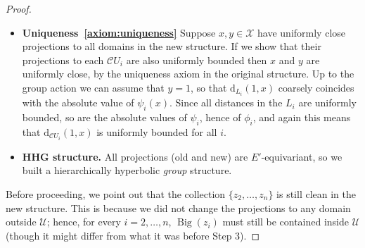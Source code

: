 \documentclass[svgnames]{amsart}
\theoremstyle{plain}
\theoremstyle{definition}
\newcommand{\cal}[1]{\mathcal{#1}}
\newcommand{\C}{\cal C}
\newcommand{\Bigdom}[1]{\operatorname{Big}\left(#1\right)}
\newcommand{\dist}{\mathrm{d}}
\begin{document}
\begin{proof}
\begin{itemize}
        
        Thus, suppose $\Bigdom{z}$ intersects the support of $\cal V$ nontrivially. If $U_1$ appears in $\cal V$ then let $g_1$ be the coordinate $q_1\in L_1$ that we have to realise; otherwise let $g_1=1\in E'$. Whenever $U_i\in \cal V$ for some $i\ge 2$ let $q_i\in L_i$ the coordinate to realise, choose $g_i\in E'$ such that $\phi_i(g_i)=\psi_i(q_i)+\psi_1(g_1)$, and let $p_i=\pi_{\C U_i}(g_i)$.
        By the partial realisation axiom for the original structure, there exists some $x\in \cal X$ realising the collection $$\{(U_i, p_i\in \cal C U_i)\}_{U_i\in (\Bigdom{z}-\{U_1\})\cap \cal V}\cup \{(V_i,q_i\in \C V_i)\}_{V_i\in \cal V-(\Bigdom{z}-\{U_1\})},$$
        and we claim that $x$ is uniformly close to $p_i$ in each $L_i$. Since $x$ is a realisation point, for every $i=1,\ldots,j$ we have that $\dist_{\C U_i}(g_i,x)\le \delta$, so that $\phi_i(x)$ and $\phi_i(g_i)$ are uniformly close. In turn, this means that $\psi_i(x)$ is uniformly close to $\psi_i(p_i)$ for all $i$, and therefore $\dist_{L_i}(p_i,x)$ is uniformly bounded, as required.
        \item \textbf{Uniqueness~\ref{axiom:uniqueness}} Suppose $x,y\in \cal X$ have uniformly close projections to all domains in the new structure. If we show that their projections to each $\C U_i$ are also uniformly bounded then $x$ and $y$ are uniformly close, by the uniqueness axiom in the original structure. Up to the group action we can assume that $y=1$, so that $\dist_{L_i}(1,x)$ coarsely coincides with the absolute value of $\psi_i(x)$. Since all distances in the $L_i$ are uniformly bounded, so are the absolute values of $\psi_i$, hence of $\phi_i$, and again this means that $\dist_{\C U_i}(1,x)$ is uniformly bounded for all $i$. 
        \item \textbf{HHG structure.} All projections (old and new) are $E'$-equivariant, so we built a hierarchically hyperbolic \emph{group} structure.
    \end{itemize}
    Before proceeding, we point out that the collection $\{z_2,\ldots, z_n\}$ is still clean in the new structure. This is because we did not change the projections to any domain outside $\cal U$; hence, for every $i=2,\ldots,n$, $\Bigdom{z_i}$ must still be contained inside $\cal U$ (though it might differ from what it was before Step 3). 
    


\end{proof}
\end{document}
